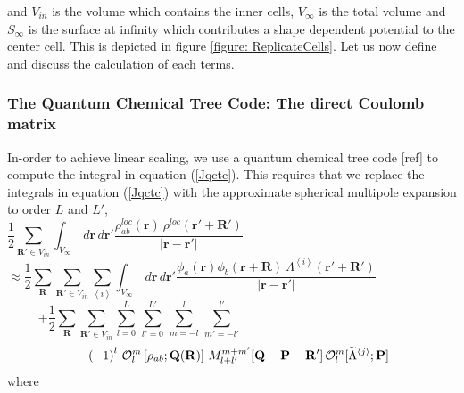 \commentoutA{\documentclass[prb,aps,twocolumn,showpacs,twocolumngrid,superbib]{revtex4}}
\begin{document}
 and \( V_{in} \) is the volume which contains the inner cells, \( V_{\infty } \)
is the total volume and \( S_{\infty } \) is the surface at infinity
which contributes a shape dependent potential to the center cell.
This is depicted in figure \ref{figure: ReplicateCells}. Let us now
define and discuss the calculation of each terms.


\subsubsection{The Quantum Chemical Tree Code: The direct Coulomb matrix}

In-order to achieve linear scaling, we use a quantum chemical tree
code {[}ref{]} to compute the integral in equation (\ref{Jqctc}).
This requires that we replace the integrals in equation (\ref{Jqctc})
with the approximate spherical multipole expansion to order \( L \)
and \( L' \),\[
\frac{1}{2}\sum _{{\mathbf{R}'}\in V_{in}}\int _{V_{\infty }}\, d{\mathbf{r}}\, d{\mathbf{r}'}\frac{\rho _{ab}^{loc}\left( {\mathbf{r}}\right) \: \rho ^{loc}\left( {\mathbf{r}'+\mathbf{R}'}\right) }{\left| \mathbf{r}-\mathbf{r}'\right| }\qquad \qquad \qquad \qquad \qquad \qquad \qquad \qquad \qquad \qquad \begin{array}{c}
\\

\end{array}\]
\[
\approx \frac{1}{2}\sum _{\mathbf{R}}\sum _{\mathbf{R}'\in V_{in}}\sum _{\left\langle i\right\rangle }\int _{V_{\infty }}\, d{\mathbf{r}}\, d{\mathbf{r}'}\frac{\phi _{a}({\mathbf{r}})\phi _{b}({\mathbf{r}+\mathbf{R}})\: \Lambda ^{\left\langle i\right\rangle }\left( {\mathbf{r}'+\mathbf{R}'}\right) }{\left| \mathbf{r}-\mathbf{r}'\right| }\qquad \qquad \qquad \begin{array}{c}
\\

\end{array}\]
\begin{equation}
\label{QCTC}
+\frac{1}{2}\sum _{\mathbf{R}}\sum _{\mathbf{R}'\in V_{in}}\sum _{l=0}^{L}\, \sum _{l'=0}^{L'}\, \sum _{m=-l}^{l}\, \sum _{m'=-l'}^{l'}\qquad \qquad \qquad \qquad \qquad \qquad \qquad \begin{array}{c}
\\

\end{array}
\end{equation}
\[
\, \qquad \left( -1\right) ^{l}\, {\cal O}^{m}_{l}\left[ \rho _{ab};\mathbf{Q}(\mathbf{R})\right] \, M_{l+l'}^{m+m'}[\mathbf{Q}-\mathbf{P}-\mathbf{R}']\, {\cal O}_{l}^{m}[\widetilde{\Lambda }^{\left\langle j\right\rangle };\mathbf{P}]\begin{array}{c}
\\

\end{array}\]
 where
\end{document}
